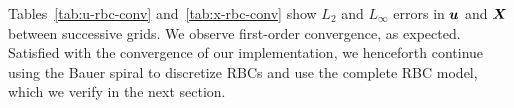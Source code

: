 Tables~\ref{tab:u-rbc-conv} and~\ref{tab:x-rbc-conv} show $L_2$ and $L_\infty$ errors in
$\boldsymbol{u}$ and $\boldsymbol{X}$ between successive grids. We observe first-order convergence, as expected.
Satisfied with the convergence of our implementation, we henceforth continue using the
Bauer spiral to discretize RBCs and use the complete RBC model, which we verify in the
next section.
